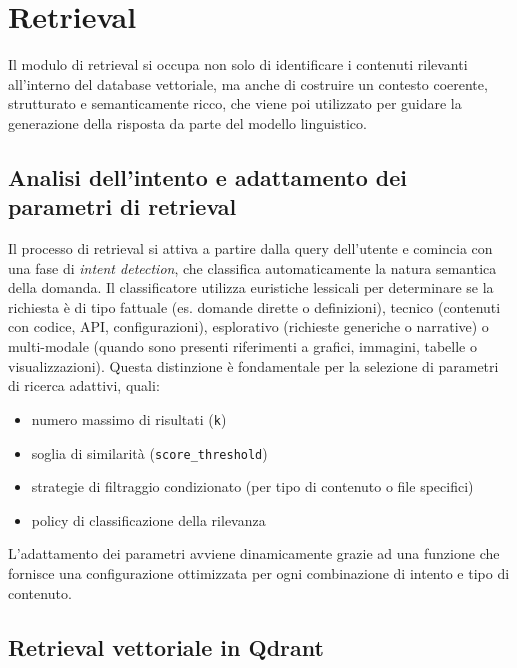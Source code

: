 \section{Retrieval}

Il modulo di retrieval si occupa non solo di identificare i contenuti rilevanti all'interno del database vettoriale, ma anche di costruire un contesto coerente, strutturato e semanticamente ricco, che viene poi utilizzato per guidare la generazione della risposta da parte del modello linguistico. 

\subsection{Analisi dell'intento e adattamento dei parametri di retrieval}

Il processo di retrieval si attiva a partire dalla query dell’utente e comincia con una fase di \textit{intent detection}, che classifica automaticamente la natura semantica della domanda. Il classificatore utilizza euristiche lessicali per determinare se la richiesta è di tipo fattuale (es. domande dirette o definizioni), tecnico (contenuti con codice, API, configurazioni), esplorativo (richieste generiche o narrative) o multi-modale (quando sono presenti riferimenti a grafici, immagini, tabelle o visualizzazioni). Questa distinzione è fondamentale per la selezione di parametri di ricerca adattivi, quali:
\begin{itemize}
    \item numero massimo di risultati (\verb|k|)
    \item soglia di similarità (\verb|score_threshold|)
    \item strategie di filtraggio condizionato (per tipo di contenuto o file specifici)
    \item policy di classificazione della rilevanza
\end{itemize}
L’adattamento dei parametri avviene dinamicamente grazie ad una funzione che fornisce una configurazione ottimizzata per ogni combinazione di intento e tipo di contenuto.

\subsection{Retrieval vettoriale in Qdrant}

